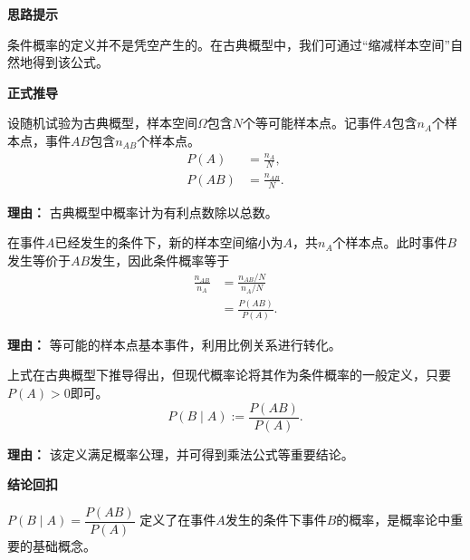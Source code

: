 \begin{proofbox}
	\textbf{\textcolor{CProof}{思路提示}}

	条件概率的定义并不是凭空产生的。在古典概型中，我们可通过“缩减样本空间”自然地得到该公式。

	\medskip
	\textbf{\textcolor{CProof}{正式推导}}
	\begin{description}[style=nextline, leftmargin=2.8em, labelsep=0.5em, itemsep=0.55em]
		\item[\textbf{步骤一（古典概型假设）：}] 设随机试验为古典概型，样本空间$\Omega$包含$N$个等可能样本点。记事件$A$包含$n_A$个样本点，事件$AB$包含$n_{AB}$个样本点。
			\[
				\begin{aligned}
					P(A) &= \frac{n_A}{N}, \\
					P(AB) &= \frac{n_{AB}}{N}.
			\end{aligned}
			\]
			\par\textbf{理由：} 古典概型中概率计为有利点数除以总数。

		\item[\textbf{步骤二（计算条件概率）：}] 在事件$A$已经发生的条件下，新的样本空间缩小为$A$，共$n_A$个样本点。此时事件$B$发生等价于$AB$发生，因此条件概率等于
			\[
				\begin{aligned}
					\frac{n_{AB}}{n_A} &= \frac{n_{AB}/N}{n_A/N} \\
					&= \frac{P(AB)}{P(A)}.
			\end{aligned}
			\]
			\par\textbf{理由：} 等可能的样本点基本事件，利用比例关系进行转化。

		\item[\textbf{步骤三（推广到一般）：}] 上式在古典概型下推导得出，但现代概率论将其作为条件概率的一般定义，只要$P(A)>0$即可。
			\[
				P(B \mid A) := \frac{P(AB)}{P(A)}.
			\]
			\par\textbf{理由：} 该定义满足概率公理，并可得到乘法公式等重要结论。
	\end{description}

	\medskip
	\textbf{\textcolor{CProof}{结论回扣}}

	$\boxed{P(B \mid A) = \dfrac{P(AB)}{P(A)}}$ 定义了在事件$A$发生的条件下事件$B$的概率，是概率论中重要的基础概念。
\end{proofbox}
